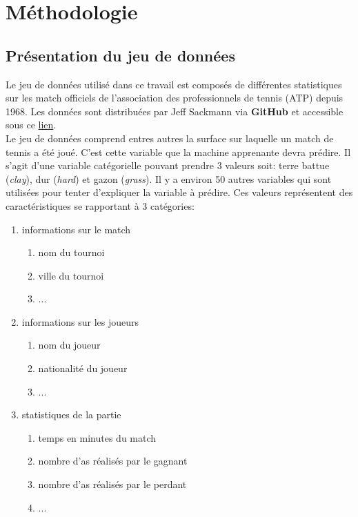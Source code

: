 \section{Méthodologie}

\subsection{Présentation du jeu de données}
Le jeu de données utilisé dans ce travail est composés de différentes statistiques sur les match officiels de l'association des professionnels de tennis (ATP) depuis 1968. Les données sont distribuées par Jeff Sackmann via \textbf{GitHub} et accessible sous ce \href{https://github.com/JeffSackmann/tennis_atp}{lien}.\\
Le jeu de données comprend entres autres la surface sur laquelle un match de tennis a été joué. C'est cette variable que la machine apprenante devra prédire. Il s'agit d'une variable catégorielle pouvant prendre 3 valeurs soit: terre battue (\textit{clay}), dur (\textit{hard}) et gazon (\textit{grass}). Il y a environ 50 autres variables qui sont utilisées pour tenter d'expliquer la variable à prédire. Ces valeurs représentent des caractéristiques se rapportant à 3 catégories:

\begin{enumerate}
  \item informations sur le match
    \begin{enumerate}
      \item nom du tournoi
      \item ville du tournoi
      \item ...
    \end{enumerate}
  \item informations sur les joueurs
    \begin{enumerate}
      \item nom du joueur
      \item nationalité du joueur
      \item ...
    \end{enumerate}
  \item statistiques de la partie
    \begin{enumerate}
      \item temps en minutes du match
      \item nombre d'as réalisés par le gagnant
      \item nombre d'as réalisés par le perdant
      \item ...
    \end{enumerate}
\end{enumerate}

